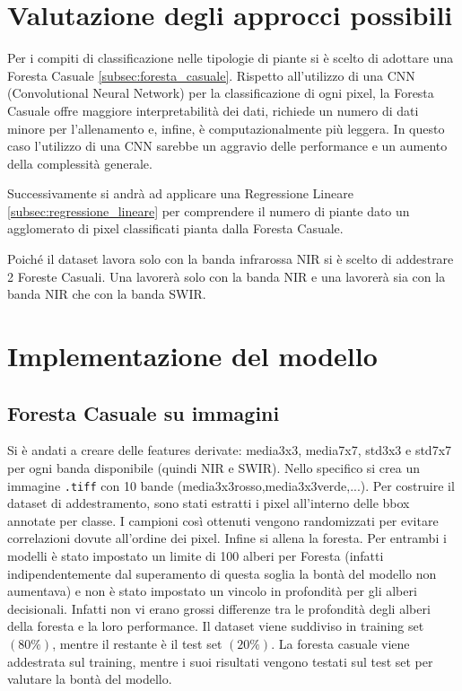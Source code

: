 \section{Valutazione degli approcci possibili}

Per i compiti di classificazione nelle tipologie di piante si è scelto di adottare una Foresta Casuale \ref{subsec:foresta_casuale}.  
Rispetto all'utilizzo di una CNN (Convolutional Neural Network) per la classificazione di ogni pixel, la Foresta Casuale 
offre maggiore interpretabilità dei dati, richiede un numero di dati minore per l'allenamento e, infine, 
è computazionalmente più leggera. In questo caso l'utilizzo di una CNN sarebbe un aggravio delle performance e 
un aumento della complessità generale.


Successivamente si andrà ad applicare una Regressione Lineare 
\ref{subsec:regressione_lineare} per comprendere il numero di piante dato un 
agglomerato di pixel classificati pianta dalla Foresta Casuale. 

Poiché il dataset \cite{guillem_montalban_faet_2025_17866344} lavora solo con la banda infrarossa NIR si è scelto di addestrare 2 Foreste Casuali. 
Una lavorerà solo con la banda NIR e una lavorerà sia con la banda NIR che con la banda SWIR.

\section{Implementazione del modello}
\subsection{Foresta Casuale su immagini}
Si è andati a creare delle features derivate: media3x3, media7x7, std3x3 e std7x7 per ogni banda disponibile (quindi NIR e SWIR). Nello specifico si crea un immagine \texttt{.tiff} con 10 bande (media3x3rosso,media3x3verde,...).
Per costruire il dataset di addestramento, sono stati estratti i pixel all'interno delle bbox annotate per classe. I campioni così ottenuti vengono randomizzati per evitare correlazioni dovute all'ordine dei pixel.
Infine si allena la foresta.
Per entrambi i modelli è stato impostato un limite
di 100 alberi per Foresta (infatti indipendentemente dal superamento di questa soglia la bontà del modello non aumentava) e non è stato impostato un vincolo 
in profondità per gli alberi decisionali. Infatti non vi erano grossi differenze tra le profondità degli alberi della foresta e la loro performance.
Il dataset viene suddiviso in training set $(80\%)$, mentre
il restante è il test set $(20\%)$. La foresta casuale viene addestrata sul training, 
mentre i suoi risultati vengono testati sul test set per valutare la bontà del modello.




